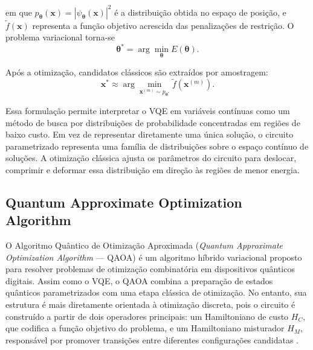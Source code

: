 \noindent em que $p_{\boldsymbol{\theta}}(\mathbf{x}) = |\psi_{\boldsymbol{\theta}}(\mathbf{x})|^2$ é a distribuição obtida no espaço de posição, e $\widetilde{f}(\mathbf{x})$ representa a função objetivo acrescida das penalizações de restrição. O problema variacional torna-se
\begin{equation}
    \boldsymbol{\theta}^{*}
    =
    \arg\min_{\boldsymbol{\theta}}
    E(\boldsymbol{\theta}).
    \label{eq:cv_vqe_optimization}
\end{equation}

Após a otimização, candidatos clássicos são extraídos por amostragem:
\begin{equation}
    \mathbf{x}^{*}
    \approx
    \arg\min_{\mathbf{x}^{(m)} \sim p_{\boldsymbol{\theta}^{*}}}
    \widetilde{f}(\mathbf{x}^{(m)}).
    \label{eq:cv_vqe_sampling_solution}
\end{equation}

Essa formulação permite interpretar o VQE em variáveis contínuas como um método de busca por distribuições de probabilidade concentradas em regiões de baixo custo. Em vez de representar diretamente uma única solução, o circuito parametrizado representa uma família de distribuições sobre o espaço contínuo de soluções. A otimização clássica ajusta os parâmetros do circuito para deslocar, comprimir e deformar essa distribuição em direção às regiões de menor energia.



\subsection{Quantum Approximate Optimization Algorithm}
\label{sec:qaoa}

O Algoritmo Quântico de Otimização Aproximada (\textit{Quantum Approximate Optimization Algorithm} --- QAOA) é um algoritmo híbrido variacional proposto para resolver problemas de otimização combinatória em dispositivos quânticos digitais. Assim como o VQE, o QAOA combina a preparação de estados quânticos parametrizados com uma etapa clássica de otimização. No entanto, sua estrutura é mais diretamente orientada à otimização discreta, pois o circuito é construído a partir de dois operadores principais: um Hamiltoniano de custo $H_C$, que codifica a função objetivo do problema, e um Hamiltoniano misturador $H_M$, responsável por promover transições entre diferentes configurações candidatas \cite{farhi_quantum_2014}.

